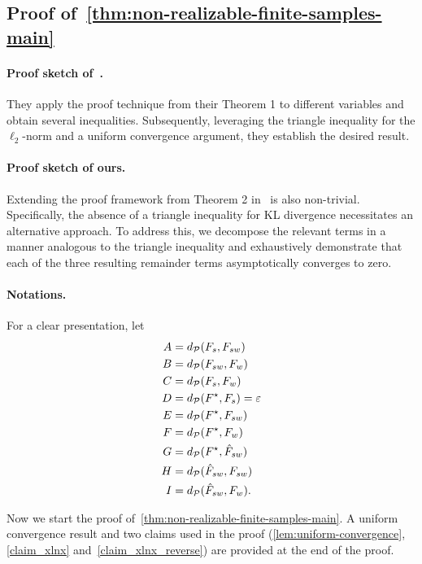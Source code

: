 \subsection{Proof of~\cref{thm:non-realizable-finite-samples-main}} \label{proof_non-realizable-main}


\paragraph{Proof sketch of~\citet{charikar2024quantifying}.}
They apply the proof technique from their Theorem 1 to different variables and obtain several inequalities.
Subsequently, leveraging the triangle inequality for the $\ell_2$-norm and a uniform convergence argument, they establish the desired result.

\paragraph{Proof sketch of ours.}
Extending the proof framework from Theorem 2 in~\citep{charikar2024quantifying} is also non-trivial. 
Specifically, the absence of a triangle inequality for KL divergence necessitates an alternative approach. 
To address this, we decompose the relevant terms in a manner analogous to the triangle inequality and exhaustively demonstrate that each of the three resulting remainder terms asymptotically converges to zero.


\paragraph{Notations.}
For a clear presentation, let
\begin{align*}
    A &= d_\mathcal{P}(F_s, F_{sw})\\
    B &=d_\mathcal{P}(F_{sw}, F_w) \\
    C &= d_\mathcal{P}(F_s, F_w)\\
    D &= d_\mathcal{P}(F^\star, F_s) =\varepsilon\\
    E &= d_\mathcal{P}(F^\star, F_{sw}) \\
    F &= d_\mathcal{P}(F^\star, F_w) \\
    G &= d_\mathcal{P}(F^\star, \hat{F}_{sw}) \\
    H &= d_\mathcal{P}(\hat{F}_{sw}, F_{sw}) \\
    I &= d_\mathcal{P}(\hat{F}_{sw}, F_w).
\end{align*}

Now we start the proof of~\cref{thm:non-realizable-finite-samples-main}.
A uniform convergence result and two claims used in the proof (\cref{lem:uniform-convergence}, \cref{claim_xlnx} and~\cref{claim_xlnx_reverse}) are provided at the end of the proof.



